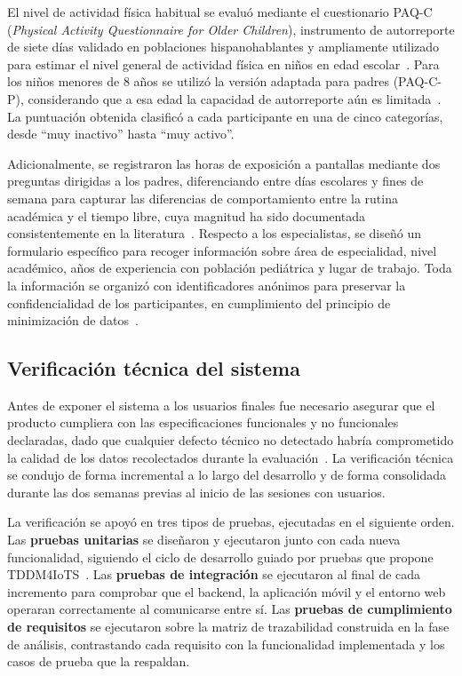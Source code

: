 				El nivel de actividad física habitual se evaluó mediante el cuestionario PAQ-C (\textit{Physical Activity Questionnaire for Older Children}), instrumento de autorreporte de siete días validado en poblaciones hispanohablantes y ampliamente utilizado para estimar el nivel general de actividad física en niños en edad escolar~\cite{MateoOrcajada2024}. Para los niños menores de 8 años se utilizó la versión adaptada para padres (PAQ-C-P), considerando que a esa edad la capacidad de autorreporte aún es limitada~\cite{Hourcade2015}. La puntuación obtenida clasificó a cada participante en una de cinco categorías, desde ``muy inactivo'' hasta ``muy activo''.
				
				Adicionalmente, se registraron las horas de exposición a pantallas mediante dos preguntas dirigidas a los padres, diferenciando entre días escolares y fines de semana para capturar las diferencias de comportamiento entre la rutina académica y el tiempo libre, cuya magnitud ha sido documentada consistentemente en la literatura~\cite{Wilhite2023,VegaDiaz2023}. Respecto a los especialistas, se diseñó un formulario específico para recoger información sobre área de especialidad, nivel académico, años de experiencia con población pediátrica y lugar de trabajo. Toda la información se organizó con identificadores anónimos para preservar la confidencialidad de los participantes, en cumplimiento del principio de minimización de datos~\cite{LOPDP2021}.
		
			\subsection{Verificación técnica del sistema}
				Antes de exponer el sistema a los usuarios finales fue necesario asegurar que el producto cumpliera con las especificaciones funcionales y no funcionales declaradas, dado que cualquier defecto técnico no detectado habría comprometido la calidad de los datos recolectados durante la evaluación~\cite{Fowler2002}. La verificación técnica se condujo de forma incremental a lo largo del desarrollo y de forma consolidada durante las dos semanas previas al inicio de las sesiones con usuarios.
				
				La verificación se apoyó en tres tipos de pruebas, ejecutadas en el siguiente orden. Las \textbf{pruebas unitarias} se diseñaron y ejecutaron junto con cada nueva funcionalidad, siguiendo el ciclo de desarrollo guiado por pruebas que propone TDDM4IoTS~\cite{GuerreroUlloa2024,Fowler2002}. Las \textbf{pruebas de integración} se ejecutaron al final de cada incremento para comprobar que el backend, la aplicación móvil y el entorno web operaran correctamente al comunicarse entre sí. Las \textbf{pruebas de cumplimiento de requisitos} se ejecutaron sobre la matriz de trazabilidad construida en la fase de análisis, contrastando cada requisito con la funcionalidad implementada y los casos de prueba que la respaldan.
				
